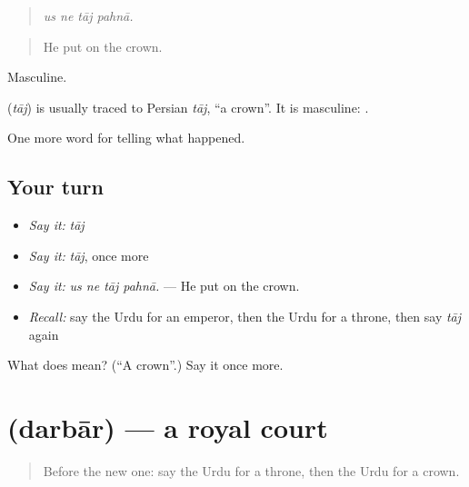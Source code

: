 \begin{quote}
   
\end{quote}

\begin{quote}
\emph{us ne tāj pahnā.}
\end{quote}

\begin{quote}
He put on the crown.
\end{quote}

Masculine.

\begin{cousinweb}
\textbf{} (\emph{tāj}) is usually traced to Persian \emph{tāj}, \textquotedblleft{}a crown\textquotedblright{}. It is masculine: \textbf{ }.
\end{cousinweb}

\begin{grammarlens}[title={What you've built}]
One more word for telling what happened.
\end{grammarlens}

\subsection*{Your turn}
\begin{itemize}
\raggedright
  \item \emph{Say it:} \emph{tāj}
  \item \emph{Say it:} \emph{tāj}, once more
  \item \emph{Say it:} \emph{us ne tāj pahnā.} — He put on the crown.
  \item \emph{Recall:} say the Urdu for an emperor, then the Urdu for a throne, then say \emph{tāj} again
\end{itemize}

\begin{tcolorbox}[breakable,colback=teal!4,colframe=teal!35!black,title={Before you move on}]
What does  mean? (\textquotedblleft{}A crown\textquotedblright{}.) Say it once more.
\end{tcolorbox}
\section[\texorpdfstring{\ur{دربار} (darbār)}{دربار (darbār)}]{ (darbār) — a royal court}

\label{lesson:UR-C308-darbar}



\begin{quote}
Before the new one: say the Urdu for a throne, then the Urdu for a crown.
\end{quote}

